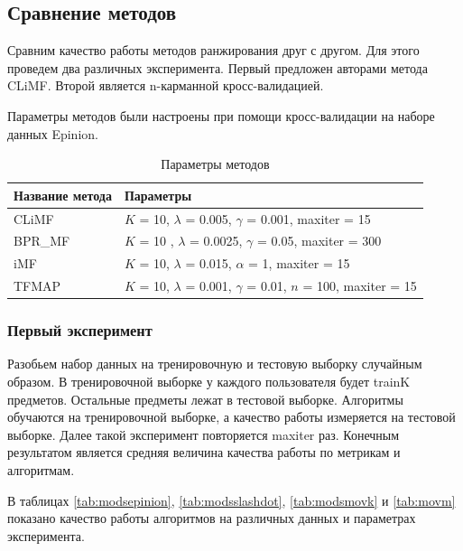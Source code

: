 \documentclass[14pt]{extarticle}
\begin{document}
\subsection{Сравнение методов}
 Сравним качество работы методов ранжирования друг с другом. Для этого проведем два различных  эксперимента. Первый предложен авторами метода CLiMF. Второй является n-карманной кросс-валидацией.
 
Параметры методов были настроены при помощи кросс-валидации на наборе данных Epinion. 

\begin{table}[H]
\caption{Параметры методов}
\begin{tabular}{|l|l|}
\hline
Название метода & Параметры\\
\hline 
  CLiMF & $K$ = 10,  $\lambda$ = 0.005, $\gamma$ = 0.001, maxiter = 15\\
\hline
  BPR\_MF & $K$ = 10 ,  $\lambda$ = 0.0025, $\gamma$ = 0.05, maxiter = 300\\
\hline 
  iMF & $K$ = 10,  $\lambda$ = 0.015, $\alpha$ = 1, maxiter = 15\\
\hline 
TFMAP & $K$ = 10, $\lambda$ = 0.001, $\gamma$ = 0.01, $n$ = 100,  maxiter = 15\\
\hline
\end{tabular}
\end{table} 
 
 
 \subsubsection{Первый эксперимент}
  
 Разобьем набор данных на тренировочную и тестовую выборку случайным образом. В тренировочной выборке у каждого пользователя будет trainK предметов. Остальные предметы лежат в тестовой выборке. Алгоритмы обучаются на тренировочной выборке, а качество работы измеряется на тестовой выборке. Далее такой эксперимент повторяется maxiter раз. Конечным результатом является средняя величина качества работы по метрикам и алгоритмам. 
 
 

 
В таблицах \ref{tab:modsepinion}, \ref{tab:modsslashdot}, \ref{tab:modsmovk} и \ref{tab:movm} показано качество работы алгоритмов на различных данных и параметрах эксперимента.
\end{document}

